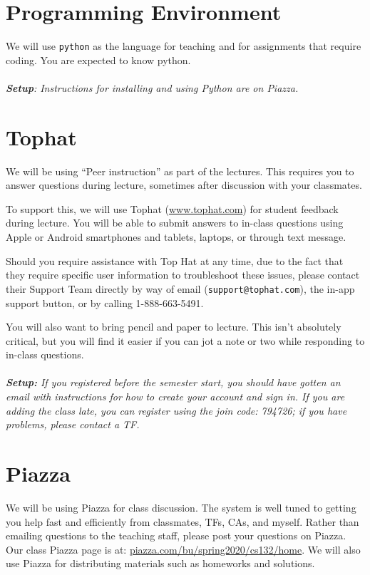 \documentclass[11pt]{article}
\begin{document}
\section*{Programming Environment}

We will use \texttt{python} as the language for teaching and for
assignments that require coding.    You are expected to know python.  
\\
~\\\noindent\emph{\textbf{Setup}: Instructions for installing and
using Python are on Piazza.}

\section*{Tophat}

We will be using ``Peer instruction'' as part of the lectures.  This
requires you to answer questions during lecture, sometimes
after discussion with your classmates.   

To support this, we will use Tophat (\url{www.tophat.com}) for student
feedback during lecture. You will be able to submit answers to in-class
questions using Apple or Android smartphones and tablets, laptops, or
through text message. 

Should you require assistance with Top Hat at any time, due to the fact
that they require specific user information to troubleshoot these
issues, please contact their Support Team directly by way of email
(\texttt{support@tophat.com}), the in-app support button, or by calling
1-888-663-5491. 

You will also want to bring pencil and paper to lecture.   This isn't
absolutely critical, but you will find it easier if you can jot a note
or two while responding to in-class questions.
\\
~\\\emph{\textbf{Setup:} If you registered before the semester start,
  you should have gotten an email with instructions for how to create
  your account and sign in.  If you are adding the
  class late, you can register using the join code: 794726; if you have
  problems, please contact a TF.} 

\section*{Piazza}

We will be using Piazza for class discussion. The system is well
tuned to getting you help fast and efficiently from classmates, TFs,
CAs,
and myself. Rather than emailing questions to the teaching staff,
please post your questions on Piazza.   Our class Piazza
page  is at: \url{piazza.com/bu/spring2020/cs132/home}. 
We will also use Piazza for distributing materials
such as homeworks and solutions.
\end{document}
